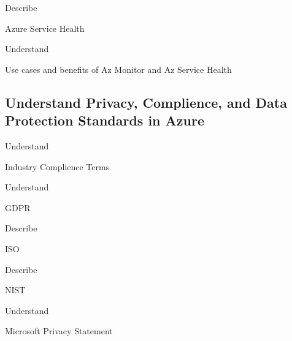 \documentclass{scrartcl}
\newenvironment{flashcard}[2][]{%
    #1
    \vfill
    \centerline{\Large{#2}}
    \vfill
    \newpage
}
{\newpage}
\newcommand{\subsectioncard}[1]{
    \vspace*{\stretch{1}}
    \subsection{#1}
    \vspace*{\stretch{1}}
    \pagebreak
}
\begin{document}
    \begin{flashcard}[Describe]{Azure Service Health}

    \end{flashcard}

    \begin{flashcard}[Understand]{Use cases and benefits of Az Monitor and Az Service Health}

    \end{flashcard}

    \subsectioncard{Understand Privacy, Complience, and Data Protection Standards in Azure}

    \begin{flashcard}[Understand]{Industry Complience Terms}

    \end{flashcard}

    \begin{flashcard}[Understand]{GDPR}

    \end{flashcard}

    \begin{flashcard}[Describe]{ISO}

    \end{flashcard}

    \begin{flashcard}[Describe]{NIST}

    \end{flashcard}

    \begin{flashcard}[Understand]{Microsoft Privacy Statement}

    \end{flashcard}
\end{document}
